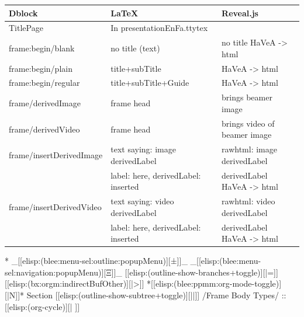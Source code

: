 \begin{whenOrg}
\begin{verblatex}
\begin{frame}[fragile,label=frameControlTypes]
\small
\begin{tabular}{|p{1.5in}|p{2.08in}|p{1.75in}|}
  \hline
  \textbf{Dblock} & \textbf{LaTeX} & \textbf{Reveal.js} \\
  \hline
  TitlePage & In presentationEnFa.ttytex & \\
  \hline
  frame:begin/blank & no title (text) & no title  HaVeA -> html \\
  \hline
  frame:begin/plain & title+subTitle & HaVeA -> html \\
  \hline
  frame:begin/regular & title+subTitle+Guide & HaVeA -> html \\
  \hline
  frame/derivedImage & frame head & brings beamer image \\
  \hline
  frame/derivedVideo & frame head & brings video of beamer image \\
  \hline
  frame/insertDerivedImage & text saying: image derivedLabel & rawhtml: image derivedLabel \\
                  & label: here, derivedLabel: inserted & derivedLabel HaVeA -> html \\
  \hline
  frame/insertDerivedVideo & text saying: video derivedLabel & rawhtml: video derivedLabel \\
                  & label: here, derivedLabel: inserted & derivedLabel HaVeA -> html \\
  \hline
\end{tabular}
\normalsize




\end{frame}
\end{verblatex}


\begin{whenOrg}
*  _[[elisp:(blee:menu-sel:outline:popupMenu)][±]]_ _[[elisp:(blee:menu-sel:navigation:popupMenu)][Ξ]]_ [[elisp:(outline-show-branches+toggle)][|=]] [[elisp:(bx:orgm:indirectBufOther)][|>]] *[[elisp:(blee:ppmm:org-mode-toggle)][|N]]*  Section    [[elisp:(outline-show-subtree+toggle)][||]]   /Frame Body Types/ ::  [[elisp:(org-cycle)][| ]]
\end{whenOrg}


\end{whenOrg}
